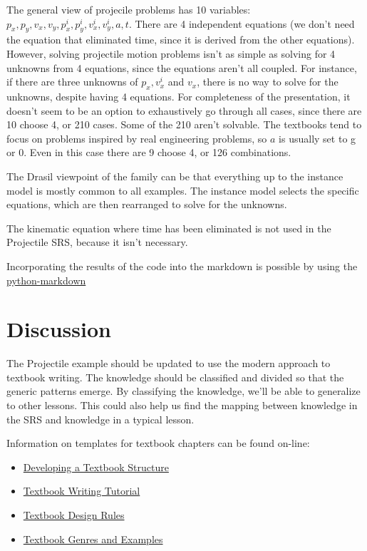 \documentclass[12pt]{article}
\begin{document}
The general view of projecile problems has 10 variables: $p_x, p_y, v_x, v_y,
p_x^i, p_y^i, v_x^i, v_y^i, a, t$.  There are 4 independent equations (we don't
need the equation that eliminated time, since it is derived from the other
equations).  However, solving projectile motion problems isn't as simple as
solving for 4 unknowns from 4 equations, since the equations aren't all coupled.
For instance, if there are three unknowns of $p_x, v_x^i$ and $v_x$, there is no
way to solve for the unknowns, despite having 4 equations.  For completeness of
the presentation, it doesn't seem to be an option to exhaustively go through all
cases, since there are 10 choose 4, or 210 cases.  Some of the 210 aren't
solvable.  The textbooks tend to focus on problems inspired by real engineering
problems, so $a$ is usually set to g or 0.  Even in this case there are 9 choose
4, or 126 combinations.

The Drasil viewpoint of the family can be that everything up to the instance
model is mostly common to all examples.  The instance model selects the specific
equations, which are then rearranged to solve for the unknowns.

The kinematic equation where time has been eliminated is not used in the
Projectile SRS, because it isn't necessary.

Incorporating the results of the code into the markdown is possible by using the
\href {https://github.com/ipython-contrib/jupyter_contrib_nbextensions/tree/master/src/jupyter_contrib_nbextensions/nbextensions/python-markdown} {python-markdown}

\section {Discussion}

The Projectile example should be updated to use the modern approach to textbook
writing.  The knowledge should be classified and divided so that the generic
patterns emerge.  By classifying the knowledge, we'll be able to generalize to
other lessons.  This could also help us find the mapping between knowledge in
the SRS and knowledge in a typical lesson.

Information on templates for textbook chapters can be found on-line:

\begin{itemize}
\item
  \href{https://canvas.umn.edu/courses/106630/pages/developing-a-textbook-structure?module_item_id=1306060}
  {Developing a Textbook Structure}
\item \href{http://edutechwiki.unige.ch/en/Textbook_writing_tutorial} {Textbook
    Writing Tutorial}
\item
  \href{https://open.ubc.ca/open-publishing-guide/phase-4/textbook-design-rules/}
  {Textbook Design Rules}
\item
  \href{http://edutechwiki.unige.ch/en/Textbook_genres_and_examples#E-Learning_and_the_Science_of_Instruction}
  {Textbook Genres and Examples}
\end{itemize}
\end{document}
